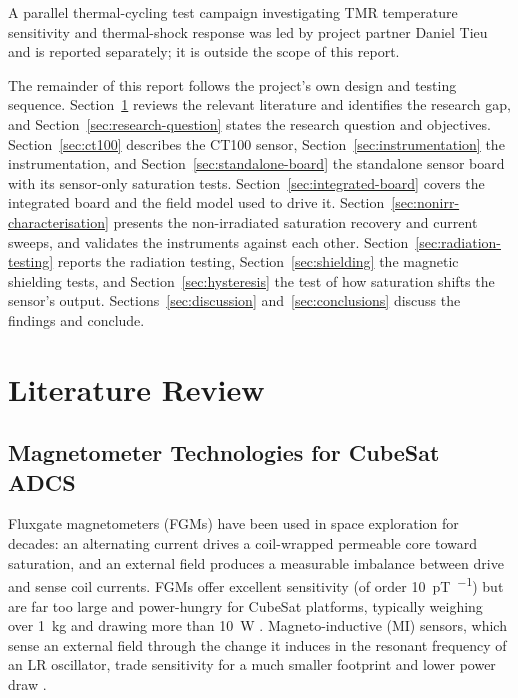 \documentclass[12pt,a4paper]{article}
\begin{document}
A parallel thermal-cycling test campaign investigating TMR temperature sensitivity and thermal-shock response was led by project partner Daniel Tieu and is reported separately; it is outside the scope of this report.

The remainder of this report follows the project's own design and testing sequence. Section~\ref{sec:litreview} reviews the relevant literature and identifies the research gap, and Section~\ref{sec:research-question} states the research question and objectives. Section~\ref{sec:ct100} describes the CT100 sensor, Section~\ref{sec:instrumentation} the instrumentation, and Section~\ref{sec:standalone-board} the standalone sensor board with its sensor-only saturation tests. Section~\ref{sec:integrated-board} covers the integrated board and the field model used to drive it. Section~\ref{sec:nonirr-characterisation} presents the non-irradiated saturation recovery and current sweeps, and validates the instruments against each other. Section~\ref{sec:radiation-testing} reports the radiation testing, Section~\ref{sec:shielding} the magnetic shielding tests, and Section~\ref{sec:hysteresis} the test of how saturation shifts the sensor's output. Sections~\ref{sec:discussion} and~\ref{sec:conclusions} discuss the findings and conclude.

\section{Literature Review}
\label{sec:litreview}

\subsection{Magnetometer Technologies for CubeSat ADCS}
\label{sec:magnetometer-tech}

Fluxgate magnetometers (FGMs) have been used in space exploration for decades: an alternating current drives a coil-wrapped permeable core toward saturation, and an external field produces a measurable imbalance between drive and sense coil currents. FGMs offer excellent sensitivity (of order \SI{10}{\pico\tesla\per\sqrt{\hertz}}) but are far too large and power-hungry for CubeSat platforms, typically weighing over \SI{1}{\kilo\gram} and drawing more than \SI{10}{\watt} \cite{survey-magnetic-sensing}. Magneto-inductive (MI) sensors, which sense an external field through the change it induces in the resonant frequency of an LR oscillator, trade sensitivity for a much smaller footprint and lower power draw \cite{survey-magnetic-sensing}.
\end{document}

